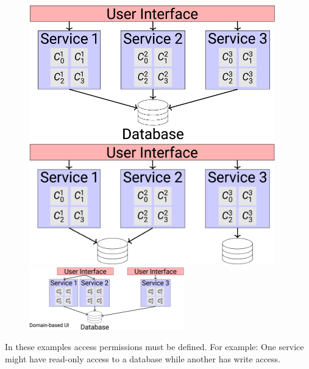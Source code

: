 \documentclass[
../../Software_Engineering_Summary.tex,
]
{subfiles}
\begin{document}
\begin{figure}
    [htp]
    \centering
    \begin{minipage}
        [t]{0.47\textwidth}
        \centering
        \includegraphics[width=0.95\textwidth]{Pics/ServiceBased1.png}
    \end{minipage}
    \hfill
    \begin{minipage}
        [t]{0.47\textwidth}
        \centering
        \includegraphics[width=0.95\textwidth]{Pics/ServiceBased3.png}
    \end{minipage}
    \newline
    \hspace{7pt}
    \includegraphics[width=0.6\textwidth]{Pics/ServiceBased2.png}
\end{figure}

In these examples access permissions must be defined. For example: One service might have read-only access to a database while another has write access.
\end{document}
